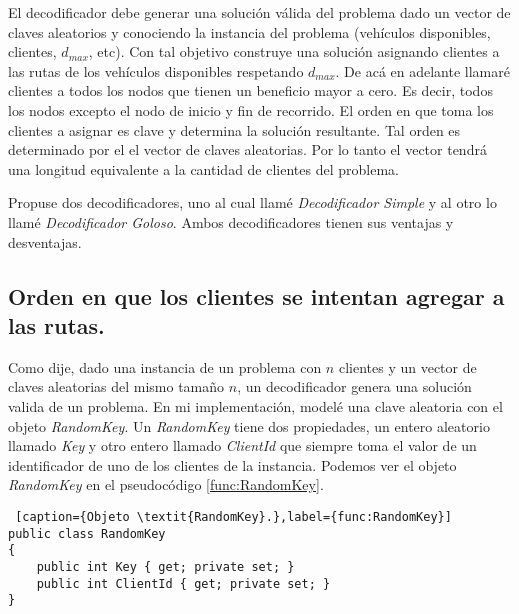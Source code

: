 El decodificador debe generar una solución válida del problema dado un vector de claves aleatorios y conociendo la instancia del problema (vehículos disponibles, clientes, $d_{max}$, etc). Con tal objetivo construye una solución asignando clientes a las rutas de los vehículos disponibles respetando $d_{max}$. De acá en adelante llamaré clientes a todos los nodos que tienen un beneficio mayor a cero. Es decir, todos los nodos excepto el nodo de inicio y fin de recorrido. El orden en que toma los clientes a asignar es clave y determina la solución resultante. Tal orden es determinado por el el vector de claves aleatorias. Por lo tanto el vector tendrá una longitud equivalente a la cantidad de clientes del problema.

\bigskip

Propuse dos decodificadores, uno al cual llamé \textit{Decodificador Simple} y al otro lo llamé \textit{Decodificador Goloso}. Ambos decodificadores tienen sus ventajas y desventajas.

\subsection{Orden en que los clientes se intentan agregar a las rutas.}\label{sec:ordenDeco}

Como dije, dado una instancia de un problema con $n$ clientes y un vector de claves aleatorias del mismo tamaño $n$, un decodificador genera una solución valida de un problema. En mi implementación, modelé una clave aleatoria con el objeto \textit{RandomKey}. Un \textit{RandomKey} tiene dos propiedades, un entero aleatorio llamado \textit{Key} y otro entero llamado \textit{ClientId} que siempre toma el valor de un identificador de uno de los clientes de la instancia. Podemos ver el objeto \textit{RandomKey} en el pseudocódigo \ref{func:RandomKey}.

\bigskip

\begin{lstlisting} [caption={Objeto \textit{RandomKey}.},label={func:RandomKey}]
public class RandomKey
{        
	public int Key { get; private set; }
	public int ClientId { get; private set; }
}
\end{lstlisting}

\bigskip

